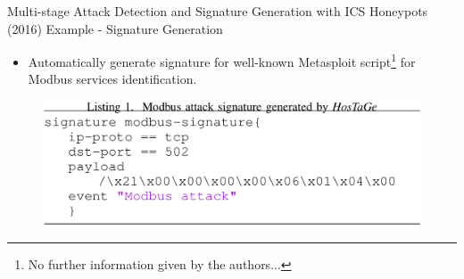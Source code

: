 \documentclass[compress]{beamer}
\begin{document}
\begin{frame}{Multi-stage Attack Detection and Signature Generation with ICS Honeypots (2016)}
    Example - Signature Generation
    \begin{itemize}
     \item Automatically generate signature for well-known Metasploit script\footnote{No further information given by the authors...} for Modbus services identification.
    \end{itemize}
    \begin{figure}
    \centering
    \includegraphics[width=1.0\textwidth]{./images/hostage-signature.png}
    \label{fig:hostage-signature}
    \end{figure}
\end{frame}
\end{document}
